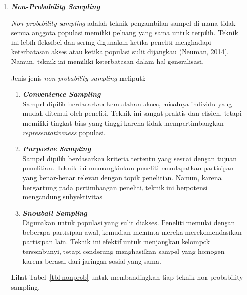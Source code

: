 \documentclass[
  indonesian,
  letterpaper,
  DIV=11,
  numbers=noendperiod]{scrreprt}
\begin{document}
\begin{enumerate}
\def\labelenumi{\alph{enumi}.}
\item
  \textbf{\emph{Non-Probability Sampling}}

  \emph{Non-probability sampling} adalah teknik pengambilan sampel di
  mana tidak semua anggota populasi memiliki peluang yang sama untuk
  terpilih. Teknik ini lebih fleksibel dan sering digunakan ketika
  peneliti menghadapi keterbatasan akses atau ketika populasi sulit
  dijangkau (Neuman, 2014). Namun, teknik ini memiliki keterbatasan
  dalam hal generalisasi.

  Jenis-jenis \emph{non-probability sampling} meliputi:

  \begin{enumerate}
  \def\labelenumii{\arabic{enumii}.}
  \item
    \textbf{\emph{Convenience Sampling}}\\
    Sampel dipilih berdasarkan kemudahan akses, misalnya individu yang
    mudah ditemui oleh peneliti. Teknik ini sangat praktis dan efisien,
    tetapi memiliki tingkat bias yang tinggi karena tidak
    mempertimbangkan \emph{representativeness} populasi.
  \item
    \textbf{\emph{Purposive Sampling}}\\
    Sampel dipilih berdasarkan kriteria tertentu yang sesuai dengan
    tujuan penelitian. Teknik ini memungkinkan peneliti mendapatkan
    partisipan yang benar-benar relevan dengan topik penelitian. Namun,
    karena bergantung pada pertimbangan peneliti, teknik ini berpotensi
    mengandung subyektivitas.
  \item
    \textbf{\emph{Snowball Sampling}}\\
    Digunakan untuk populasi yang sulit diakses. Peneliti memulai dengan
    beberapa partisipan awal, kemudian meminta mereka merekomendasikan
    partisipan lain. Teknik ini efektif untuk menjangkau kelompok
    tersembunyi, tetapi cenderung menghasilkan sampel yang homogen
    karena berasal dari jaringan sosial yang sama.
  \end{enumerate}

  Lihat Tabel~\ref{tbl-nonprob} untuk membandingkan tiap teknik
  non-probability sampling.
\end{enumerate}
\end{document}
